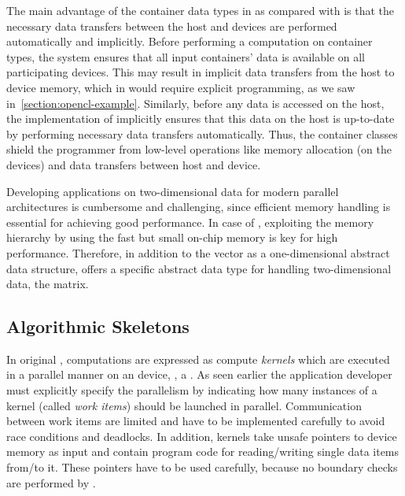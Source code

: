 The main advantage of the container data types in \SkelCL as compared with \OpenCL is that the necessary data transfers between the host and devices are performed automatically and implicitly.
Before performing a computation on container types, the \SkelCL system ensures that all input containers' data is available on all participating devices.
This may result in implicit data transfers from the host to device memory, which in \OpenCL would require explicit programming, as we saw in~\autoref{section:opencl-example}.
Similarly, before any data is accessed on the host, the implementation of \SkelCL implicitly ensures that this data on the host is up-to-date by performing necessary data transfers automatically.
Thus, the container classes shield the programmer from low-level operations like memory allocation (on the devices) and data transfers between host and device.

Developing applications on two-dimensional data for modern parallel architectures is cumbersome and challenging, since efficient memory handling is essential for achieving good performance.
In case of \GPUs, exploiting the memory hierarchy by using the fast but small on-chip memory is key for high performance.
Therefore, in addition to the vector as a one-dimensional abstract data structure, \SkelCL offers a specific abstract data type for handling two-dimensional data, the matrix.



\subsection{Algorithmic Skeletons}
\label{section:skelcl-programming-model:skeletons}
In original \OpenCL, computations are expressed as compute \emph{kernels} which are executed in a parallel manner on an \OpenCL device, \eg, a \GPU.
As seen earlier the application developer must explicitly specify the parallelism by indicating how many instances of a kernel (called \emph{work items}) should be launched in parallel.
Communication between work items are limited and have to be implemented carefully to avoid race conditions and deadlocks.
In addition, kernels take unsafe pointers to device memory as input and contain program code for reading/writing single data items from/to it.
These pointers have to be used carefully, because no boundary checks are performed by \OpenCL.

